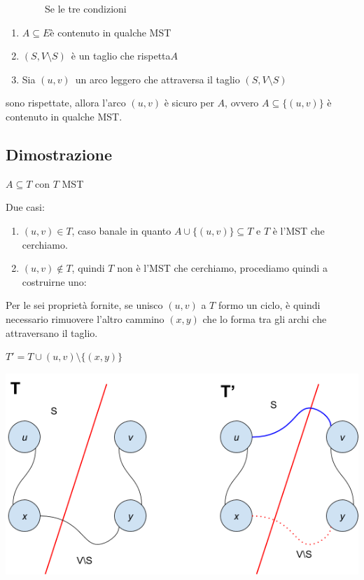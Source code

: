 \documentclass{article}
\providecommand{\tightlist}{%
  \setlength{\itemsep}{0pt}\setlength{\parskip}{0pt}}
\begin{document}
{~~~~~~~~Se le tre condizioni}

\begin{enumerate}
\tightlist
\item
  $A \subseteq E${è contenuto in qualche MST}
\item
  $(S,V \setminus S)${~è un taglio che rispetta}$A$
\item
  {Sia }$(u,v)${~un arco leggero che attraversa il taglio }$(S,V \setminus S)$
\end{enumerate}

{sono rispettate, allora l'arco $(u,v)$ è sicuro per $A$, ovvero $A \subseteq \{(u,v)\}$ è contenuto in qualche MST.}

\subsection{Dimostrazione}


{$A \subseteq T$ con $T$ MST}


{Due casi:}

\begin{enumerate}
\tightlist
\item
  {$(u,v) \in T$, caso banale in quanto $A \cup \{(u,v)\} \subseteq T$  e $T$ è l'MST che cerchiamo.}
\item
  {$(u,v) \notin T$, quindi $T$ non è l'MST che cerchiamo, procediamo quindi a costruirne uno:}
\end{enumerate}

{Per le sei proprietà fornite, se unisco $(u,v)$ a $T$ formo un ciclo, è quindi necessario rimuovere l'altro cammino $(x,y)$ che lo forma tra gli archi che attraversano il taglio. }

$T' = T \cup {(u,v)} \setminus \{(x,y)\} $

{\includegraphics{images/image530.png}}
\end{document}
